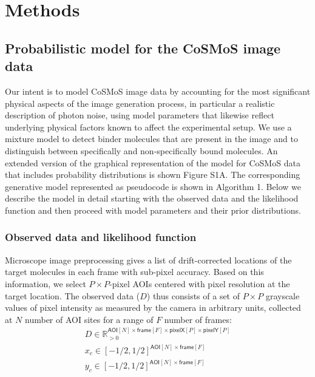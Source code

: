 \section*{Methods}

\subsection*{Probabilistic model for the CoSMoS image data} 

Our intent is to model CoSMoS image data by accounting for the most significant physical aspects of the image generation process, in particular a realistic description of photon noise, using model parameters that likewise reflect underlying physical factors known to affect the experimental setup. We use a mixture model to detect binder molecules that are present in the image and to distinguish between specifically and non-specifically bound molecules. An extended version of the graphical representation of the model for CoSMoS data that includes probability distributions is shown Figure S1A. The corresponding generative model represented as pseudocode is shown in Algorithm 1. Below we describe the model in detail starting with the observed data and the likelihood function and then proceed with model parameters and their prior distributions.

\subsubsection*{Observed data and likelihood function}

Microscope image preprocessing gives a list of drift-corrected locations of the target molecules in each frame with sub-pixel accuracy. Based on this information, we select $P \times P$-pixel AOIs centered with pixel resolution at the target location. The observed data ($D$) thus consists of a set of $P \times P$ grayscale values of pixel intensity as measured by the camera in arbitrary units, collected at $N$ number of AOI sites for a range of $F$ number of frames:
%
\begin{gather*}
    D \in \mathbb{R}_{>0}^{\mathsf{AOI}[N] \times \mathsf{frame}[F] \times \mathsf{pixelX}[P] \times \mathsf{pixelY}[P]} \\
    x_c \in [-1/2, 1/2]^{\mathsf{AOI}[N] \times \mathsf{frame}[F]} \\
    y_c \in [-1/2, 1/2]^{\mathsf{AOI}[N] \times \mathsf{frame}[F]} \\
\end{gather*}

